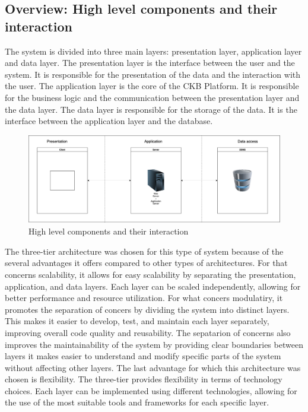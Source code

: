 \subsection{Overview: High level components and their interaction}
The system is divided into three main layers: presentation layer, application layer and data layer. The presentation layer is the interface between the user and the system. It is responsible for the presentation of the data and the interaction with the user. The application layer is the core of the CKB Platform. It is responsible for the business logic and the communication between the presentation layer and the data layer. The data layer is responsible for the storage of the data. It is the interface between the application layer and the database.
\begin{figure}[H]
    \centering
    \includegraphics[width=\textwidth]{Images/three_tier.png}
    \caption{High level components and their interaction}
\end{figure}

The three-tier architecture was chosen for this type of system because of the several advantages it offers compared to other types of architectures. For that concerns scalability, it allows for easy scalability by separating the presentation, application, and data layers. Each layer can be scaled independently, allowing for better performance and resource utilization.
For what concers modulatiry, it promotes the separation of concers by dividing the system into distinct layers. This makes it easier to develop, test, and maintain each layer separately, improving overall code quality and reusability. The sepatarion of concerns also improves the maintainability of the system by providing clear boundaries between layers it makes easier to understand and modify specific parts of the system without affecting other layers.
The last advantage for which this architecture was chosen is flexibility. The three-tier provides flexibility in terms of technology choices. Each layer can be implemented using different technologies, allowing for the use of the most suitable tools and frameworks for each specific layer.

